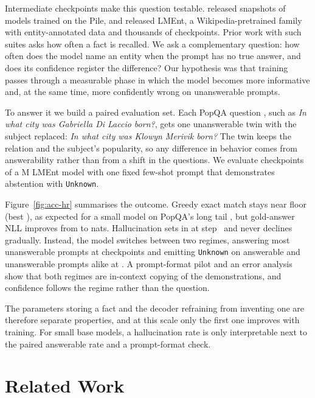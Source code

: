 \documentclass[11pt]{article}
\begin{document}
Intermediate checkpoints make this question testable. \citet{biderman2023pythia} released snapshots of models trained on the Pile, and \citet{gottesman2025lment} released LMEnt, a Wikipedia-pretrained family with entity-annotated data and thousands of checkpoints. Prior work with such suites asks how often a fact is recalled. We ask a complementary question: how often does the model name an entity when the prompt has no true answer, and does its confidence register the difference? Our hypothesis was that training passes through a measurable phase in which the model becomes more informative and, at the same time, more confidently wrong on unanswerable prompts.

To answer it we build a paired evaluation set. Each PopQA question \citep{mallen2023popqa}, such as \emph{In what city was Gabriella Di Laccio born?}, gets one unanswerable twin with the subject replaced: \emph{In what city was Klowyn Merivik born?} The twin keeps the relation and the subject's popularity, so any difference in behavior comes from answerability rather than from a shift in the questions. We evaluate \resNumCheckpoints{} checkpoints of a \resModelParams{}M LMEnt model with one fixed few-shot prompt that demonstrates abstention with \texttt{Unknown}.

Figure~\ref{fig:acc-hr} summarises the outcome. Greedy exact match stays near floor (best \resEMBest{}), as expected for a small model on PopQA's long tail \citep{mallen2023popqa}, but gold-answer NLL improves from \resNLLFirst{} to \resNLLLast{} nats. Hallucination sets in at step~\resOnsetStep{} and never declines gradually. Instead, the model switches between two regimes, answering most unanswerable prompts at \resNumAssertingCkpts{} checkpoints and emitting \texttt{Unknown} on answerable and unanswerable prompts alike at \resNumAbstainingCkpts{}. A prompt-format pilot and an error analysis show that both regimes are in-context copying of the demonstrations, and confidence follows the regime rather than the question.

The parameters storing a fact and the decoder refraining from inventing one are therefore separate properties, and at this scale only the first one improves with training. For small base models, a hallucination rate is only interpretable next to the paired answerable rate and a prompt-format check.

\section{Related Work}
\end{document}

